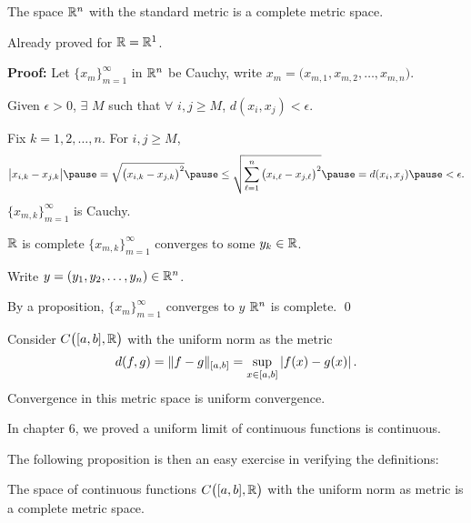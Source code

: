 \documentclass[10pt,aspectratio=149]{beamer}
\begin{document}
\begin{frame}

\begin{proposition}
The space ${\mathbb{R}}^n$ with the standard metric is a complete metric space.
\end{proposition}

\pause
Already proved for ${\mathbb{R}} = {\mathbb{R}}^1$.

\pause
\medskip

\textbf{Proof:}
Let $\{ x_m \}_{m=1}^\infty$ in ${\mathbb{R}}^n$ be Cauchy,
\pause
\quad write 
$x_m = \bigl(x_{m,1},x_{m,2},\ldots,x_{m,n}\bigr)$.

\pause
\medskip

Given $\epsilon > 0$, $\exists$ $M$ such that $\forall$
$i,j \geq M$,
\quad 
$d(x_i,x_j) < \epsilon$.

\pause
\medskip

Fix $k=1,2,\ldots,n$.
\pause
For $i,j \geq M$,
\[
\bigl\lvert x_{i,k} - x_{j,k} \bigr\rvert
\pause
=
\sqrt{{\bigl(x_{i,k} - x_{j,k}\bigr)}^2}
\pause
\leq
\sqrt{\sum_{\ell=1}^n {\bigl(x_{i,\ell}-x_{j,\ell}\bigr)}^2}
\pause
= d(x_i,x_j)
\pause
< \epsilon .
\]
\pause
\thus \quad
$\{ x_{m,k} \}_{m=1}^\infty$ is Cauchy.

\pause
\medskip

${\mathbb{R}}$ is complete
\pause
\wthus
$\{ x_{m,k} \}_{m=1}^\infty$ converges to some $y_k \in {\mathbb{R}}$.

\pause
\medskip

Write $y = (y_1,y_2,\ldots,y_n) \in {\mathbb{R}}^n$.

\pause
By a proposition, $\{ x_m \}_{m=1}^\infty$ converges
to $y$
\pause
\wthus ${\mathbb{R}}^n$ is complete.
\qed

\end{frame}

\begin{frame}

Consider $C\bigl([a,b],{\mathbb{R}}\bigr)$ with the uniform norm
as the metric
\[
d(f,g) = \lVert {f-g} \rVert_{[a,b]} = \sup_{x \in [a,b]} \left\lvert {f(x)-g(x)} \right\rvert .
\]
\pause
Convergence in this metric space is uniform convergence.

\medskip
\pause

In chapter 6, we proved a uniform limit of continuous
functions is continuous.

\medskip
\pause

The following proposition is then an easy exercise
in verifying the definitions:

\begin{proposition}
The space of continuous functions $C\bigl([a,b],{\mathbb{R}}\bigr)$ with the uniform
norm as metric is a complete metric space.
\end{proposition}

\end{frame}
\end{document}
